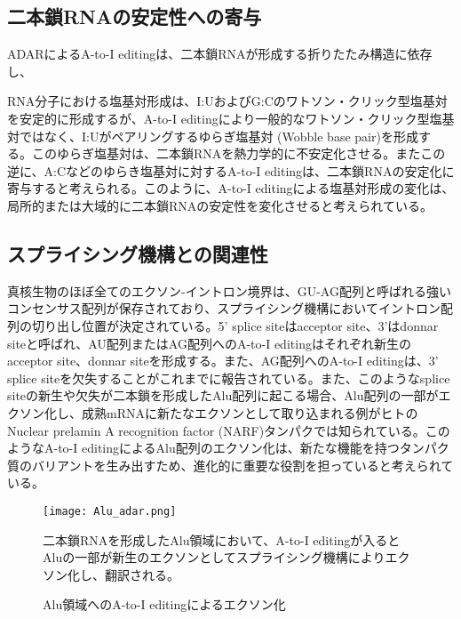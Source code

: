 \subsection{二本鎖RNAの安定性への寄与}
ADARによるA-to-I editingは、二本鎖RNAが形成する折りたたみ構造に依存し、

RNA分子における塩基対形成は、I:UおよびG:Cのワトソン・クリック型塩基対を安定的に形成するが、A-to-I editingにより一般的なワトソン・クリック型塩基対ではなく、I:Uがペアリングするゆらぎ塩基対 (Wobble base pair)を形成する。このゆらぎ塩基対は、二本鎖RNAを熱力学的に不安定化させる。またこの逆に、A:Cなどのゆらき塩基対に対するA-to-I editingは、二本鎖RNAの安定化に寄与すると考えられる。このように、A-to-I editingによる塩基対形成の変化は、局所的または大域的に二本鎖RNAの安定性を変化させると考えられている。


\subsection{スプライシング機構との関連性}
真核生物のほぼ全てのエクソン-イントロン境界は、GU-AG配列と呼ばれる強いコンセンサス配列が保存されており、スプライシング機構においてイントロン配列の切り出し位置が決定されている。5' splice siteはacceptor site、3'はdonnar siteと呼ばれ、AU配列またはAG配列へのA-to-I editingはそれぞれ新生のacceptor site、donnar siteを形成する。また、AG配列へのA-to-I editingは、3' splice siteを欠失することがこれまでに報告されている。また、このようなsplice siteの新生や欠失が二本鎖を形成したAlu配列に起こる場合、Alu配列の一部がエクソン化し、成熟mRNAに新たなエクソンとして取り込まれる例がヒトのNuclear prelamin A recognition factor (NARF)タンパクでは知られている。このようなA-to-I editingによるAlu配列のエクソン化は、新たな機能を持つタンパク質のバリアントを生み出すため、進化的に重要な役割を担っていると考えられている。
\begin{figure}[!htbp]
	\begin{center}
		\texttt{[image: Alu\_adar.png]}
	\end{center}
	\caption{Alu領域へのA-to-I editingによるエクソン化}
	\begin{flushleft}
		\small{二本鎖RNAを形成したAlu領域において、A-to-I editingが入るとAluの一部が新生のエクソンとしてスプライシング機構によりエクソン化し、翻訳される。}
	\end{flushleft}
	\label{fig:Alu_adar}
\end{figure}

